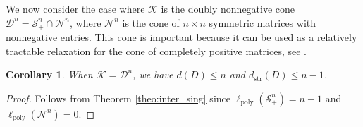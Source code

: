\documentclass{article}
\newcommand{\closure}{\mathrm{cl}\,}
\newcommand{\PSDcone}[1]{{\mathcal{S}^{#1}_+}}
\newcommand{\nonNegative}[1]{{\mathcal{N}^{#1}}}
\newcommand{\doubly}[1]{{\mathcal{D}^{#1}}}
\newcommand{\minFaceD}{ {\mathcal{F}_{\min}^D}}
\newcommand{\stdCone}{ {\mathcal{K}}}
\newcommand{\stdFace}{ \mathcal{F}}
\newcommand{\distP}{\ell _{\text{poly}}}
\newcommand{\distS}{d _{\text{str}}}
\newtheorem{corollary}[definition]{Corollary}
\begin{document}
%


We now consider the case where $\stdCone$ is the doubly nonnegative cone $\doubly{n} = \PSDcone{n} \cap 
\nonNegative{n}$, where $\nonNegative{n}$ is the cone of $n\times n$ symmetric matrices 
with nonnegative entries. This cone is important because it can be used as a relatively 
tractable relaxation for the cone of completely positive matrices, see \cite{Yoshise10,KKT15,AKKT2014}. 
\begin{corollary}\label{col:doubly_sing}
When $\stdCone = \doubly{n}$, we have $d(D) \leq n$ and $\distS(D) \leq n-1$.
\end{corollary}
\begin{proof}
Follows from Theorem \ref{theo:inter_sing} since $\distP(\PSDcone{n}) = n-1$ and $\distP(\nonNegative{n}) = 0$.
\end{proof}
\end{document}
